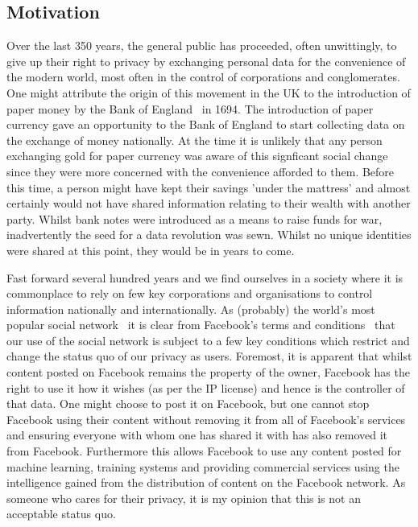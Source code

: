 \subsection{Motivation}

Over the last 350 years, the general public has proceeded, often unwittingly, to give up their right to privacy by exchanging personal data for the convenience of the modern world, most often in the control of corporations and conglomerates.
\newline
One might attribute the origin of this movement in the UK to the introduction of paper money by the Bank of England~\autocite{bankofengland:2016:online} in 1694. The introduction of paper currency gave an opportunity to the Bank of England to start collecting data on the exchange of money nationally. At the time it is unlikely that any person exchanging gold for paper currency was aware of this signficant social change since they were more concerned with the convenience afforded to them. Before this time, a person might have kept their savings 'under the mattress' and almost certainly would not have shared information relating to their wealth with another party. Whilst bank notes were introduced as a means to raise funds for war, inadvertently the seed for a data revolution was sewn. Whilst no unique identities were shared at this point, they would be in years to come.

Fast forward several hundred years and we find ourselves in a society where it is commonplace to rely on few key corporations and organisations to control information nationally and internationally. As (probably) the world's most popular social network~\autocite{worldmapsocialnetworks:2017:online} it is clear from Facebook's terms and conditions~\autocite{facebookterms:2015:online} that our use of the social network is subject to a few key conditions which restrict and change the status quo of our privacy as users. Foremost, it is apparent that whilst content posted on Facebook remains the property of the owner, Facebook has the right to use it how it wishes (as per the IP license) and hence is the controller of that data. One might choose to post it on Facebook, but one cannot stop Facebook using their content without removing it from all of Facebook's services and ensuring everyone with whom one has shared it with has also removed it from Facebook. Furthermore this allows Facebook to use any content posted for machine learning, training systems and providing commercial services using the intelligence gained from the distribution of content on the Facebook network. As someone who cares for their privacy, it is my opinion that this is not an acceptable status quo.

